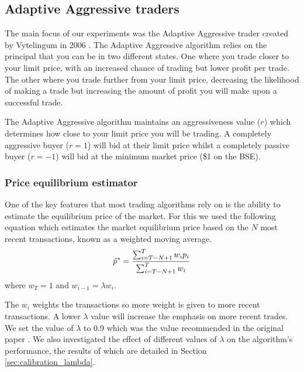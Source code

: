 \documentclass[preprint]{acm_proc_article-sp} %
\begin{document}
\subsection{Adaptive Aggressive traders} \label{sec:AA}
The main focus of our experiments was the Adaptive Aggressive trader created by
Vytelingum in 2006 \cite{AA_thesis}. The Adaptive Aggressive algorithm relies on the principal that you can be in
two different states. One where you trade closer to your limit
price, with an increased chance of trading but lower profit per trade. The other where you
trade further from your limit price, decreasing the likelihood of making a
trade but increasing the amount of profit you will make upon a successful trade.

The Adaptive Aggressive algorithm maintains an aggressiveness value ($r$) which
determines how close to your limit price you will be trading. A completely
aggressive buyer ($r = 1$) will bid at their limit price whilst a completely
passive buyer ($r = -1$) will bid at the minimum market price (\$1 on the BSE).\\



\subsubsection{Price equilibrium estimator}
One of the key features that most trading algorithms rely on is the ability to
estimate the equilibrium price of the market. For this we used the following
equation which estimates the market equilibrium price based on the $N$ most
recent transactions, known as a weighted moving average.
\begin{equation}
    \hat p^* = \frac{\sum^T_{i=T-N+1}w_ip_i}{\sum^T_{i=T-N+1}w_i}\\
    \label{eqn:equilibrium_estimator}
\end{equation}
where $w_T = 1$ and $w_{i-1} = \lambda w_i$.

The $w_i$ weights the transactions so more weight is given to more recent
transactions. A lower $\lambda$ value will increase the emphasis on more recent trades. We set the 
value of $\lambda$ to 0.9 which was the value recommended in the original paper 
\cite[p.~100]{AA_thesis}. We also investigated the effect of different values of $\lambda$ on the algorithm's 
performance, the results of which are detailed in Section \ref{sec:calibration_lambda}.\\
\end{document}
